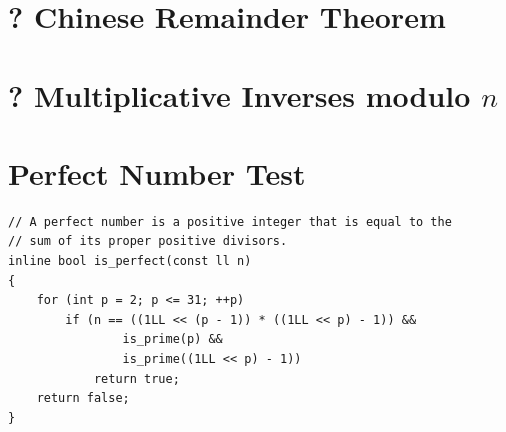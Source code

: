 \documentclass[12pt]{book}
\begin{document}
\section{? Chinese Remainder Theorem}
\section{? Multiplicative Inverses modulo $n$}
\section{Perfect Number Test}
\begin{verbatim}
// A perfect number is a positive integer that is equal to the
// sum of its proper positive divisors.
inline bool is_perfect(const ll n)
{
	for (int p = 2; p <= 31; ++p)
		if (n == ((1LL << (p - 1)) * ((1LL << p) - 1)) &&
				is_prime(p) &&
				is_prime((1LL << p) - 1))
			return true;
	return false;
}
\end{verbatim}
\end{document}
